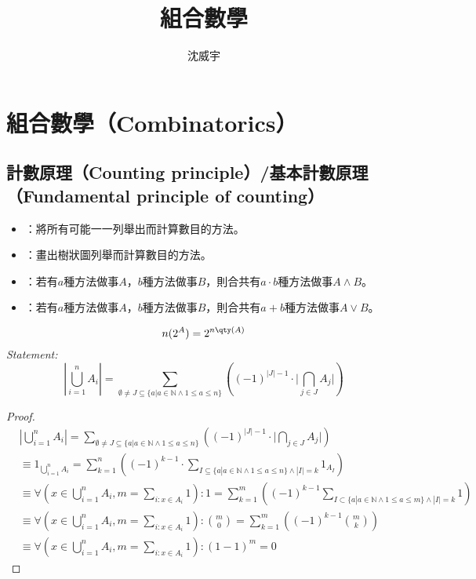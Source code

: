 \documentclass[a4paper,12pt]{report}
\begin{document}
\title{組合數學}
\author{沈威宇}
\date{\temtoday}
\titletocdoc
\section{組合數學（Combinatorics）}
\subsection{計數原理（Counting principle）/基本計數原理（Fundamental principle of counting）}
\begin{itemize}
\item {}：將所有可能一一列舉出而計算數目的方法。
\item {}：畫出樹狀圖列舉而計算數目的方法。
\item {}：若有$a$種方法做事$A$，$b$種方法做事$B$，則合共有$a\cdot b$種方法做事$A\land B$。
\item {}：若有$a$種方法做事$A$，$b$種方法做事$B$，則合共有$a+b$種方法做事$A\lor B$。
\end{itemize}
\[n(2^A)=2^{n\qty(A)}\]
\textit{Statement:}
\[ \left|\bigcup _{i=1}^n A_i\right| = \sum _{\emptyset \neq J\subseteq \{a|a \in \mathbb{N} \wedge 1\leq a\leq n\}}\left((-1)^{|J|-1}\cdot{\Biggl |}\bigcap _{j\in J}A_j{\Biggr |}\right) \]

\begin{proof}
\[
\begin{aligned}
& \left|\bigcup _{i=1}^n A_i\right| = \sum _{\emptyset \neq J\subseteq \{a|a \in \mathbb{N} \wedge 1\leq a\leq n\}}\left((-1)^{|J|-1}\cdot{\Biggl |}\bigcap _{j\in J}A_j{\Biggr |}\right) \\
& \equiv 1_{\bigcup _{i=1}^n A_i} = \sum _{k=1}^{n}\left((-1)^{k-1}\cdot\sum _{I\subseteq \{a|a \in \mathbb{N} \wedge 1\leq a\leq n\} \wedge |I|=k}1_{A_{I}}\right) \\
& \equiv \forall \left( x \in \bigcup_{i=1}^n A_i, m = \sum_{i: x \in A_i}1\right): 1 = \sum _{k=1}^{m}\left((-1)^{k-1}\sum _{I\subset \{a|a \in \mathbb{N} \wedge 1\leq a\leq m\} \wedge |I|=k}1\right) \\
& \equiv \forall \left( x \in \bigcup_{i=1}^n A_i, m = \sum_{i: x \in A_i}1\right): {\binom{m}{0}} = \sum _{k=1}^{m}\left((-1)^{k-1}{\binom {m}{k}}\right) \\
& \equiv \forall \left( x \in \bigcup_{i=1}^n A_i, m = \sum_{i: x \in A_i}1\right): (1-1)^m = 0
\end{aligned}
\]
\end{proof}
\end{document}
